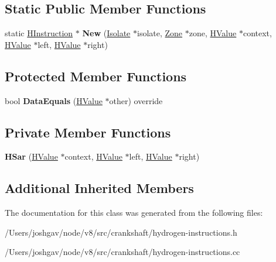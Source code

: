 \subsection*{Static Public Member Functions}
\begin{DoxyCompactItemize}
\item 
static \hyperlink{classv8_1_1internal_1_1_h_instruction}{H\+Instruction} $\ast$ {\bfseries New} (\hyperlink{classv8_1_1internal_1_1_isolate}{Isolate} $\ast$isolate, \hyperlink{classv8_1_1internal_1_1_zone}{Zone} $\ast$zone, \hyperlink{classv8_1_1internal_1_1_h_value}{H\+Value} $\ast$context, \hyperlink{classv8_1_1internal_1_1_h_value}{H\+Value} $\ast$left, \hyperlink{classv8_1_1internal_1_1_h_value}{H\+Value} $\ast$right)\hypertarget{classv8_1_1internal_1_1_h_sar_adbb4c489025e5d9c07308dd6b79c09bf}{}\label{classv8_1_1internal_1_1_h_sar_adbb4c489025e5d9c07308dd6b79c09bf}

\end{DoxyCompactItemize}
\subsection*{Protected Member Functions}
\begin{DoxyCompactItemize}
\item 
bool {\bfseries Data\+Equals} (\hyperlink{classv8_1_1internal_1_1_h_value}{H\+Value} $\ast$other) override\hypertarget{classv8_1_1internal_1_1_h_sar_a1c4804ea70c2a7f8f2f58c02e896ce64}{}\label{classv8_1_1internal_1_1_h_sar_a1c4804ea70c2a7f8f2f58c02e896ce64}

\end{DoxyCompactItemize}
\subsection*{Private Member Functions}
\begin{DoxyCompactItemize}
\item 
{\bfseries H\+Sar} (\hyperlink{classv8_1_1internal_1_1_h_value}{H\+Value} $\ast$context, \hyperlink{classv8_1_1internal_1_1_h_value}{H\+Value} $\ast$left, \hyperlink{classv8_1_1internal_1_1_h_value}{H\+Value} $\ast$right)\hypertarget{classv8_1_1internal_1_1_h_sar_a9626da41265036b958f0c0f2027c85dd}{}\label{classv8_1_1internal_1_1_h_sar_a9626da41265036b958f0c0f2027c85dd}

\end{DoxyCompactItemize}
\subsection*{Additional Inherited Members}


The documentation for this class was generated from the following files\+:\begin{DoxyCompactItemize}
\item 
/\+Users/joshgav/node/v8/src/crankshaft/hydrogen-\/instructions.\+h\item 
/\+Users/joshgav/node/v8/src/crankshaft/hydrogen-\/instructions.\+cc\end{DoxyCompactItemize}
